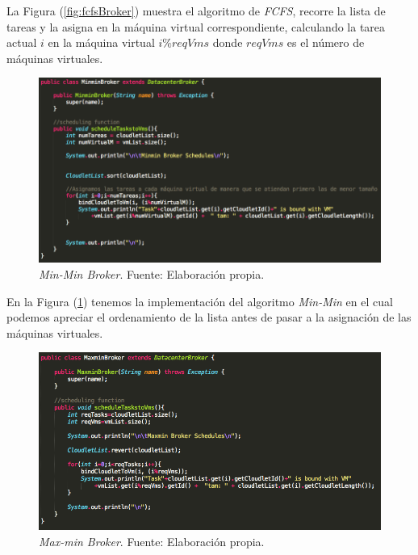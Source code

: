 La Figura (\ref{fig:fcfsBroker}) muestra el algoritmo de \textit{FCFS}, recorre la lista de tareas y la asigna en la m\'aquina virtual correspondiente, calculando la tarea actual $i$ en la m\'aquina virtual \textbf{$i\%reqVms$} donde \textbf{$reqVms$} es el n\'umero de m\'aquinas virtuales.

\renewcommand\thefigure{\arabic{figure}}
\begin{figure}[h!]
	\centering
	\includegraphics[scale=0.4]{media/minmin_broker}
	\caption{\textit{Min-Min Broker}. Fuente: Elaboración propia.}
	\label{fig:minminBroker}
\end{figure}

\newpage

En la Figura (\ref{fig:minminBroker}) tenemos la implementaci\'on del algoritmo \textit{Min-Min} en el cual podemos apreciar el ordenamiento de la lista antes de pasar a  la asignaci\'on de las m\'aquinas virtuales.

\newpage
\renewcommand\thefigure{\arabic{figure}}
\begin{figure}[h!]
	\centering
	\includegraphics[scale=0.4]{media/maxmin_broker}
	\caption{\textit{Max-min Broker}. Fuente: Elaboración propia.}
	\label{fig:maxminBroker}
\end{figure}

